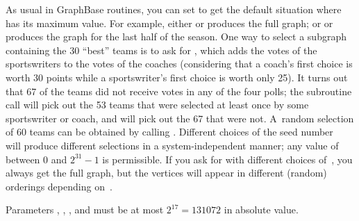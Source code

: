 As usual in GraphBase routines, you can set  to get the
default
situation where  has its maximum value. For example, either
 or  produces the
full graph;
 or 
or 
produces the graph for the last half
of the season. One way to select a subgraph containing the
30 ``best'' teams is to ask for , which adds
the votes of the sportswriters to the votes of the coaches
(considering that a coach's first choice is worth 30 points
while a sportswriter's first choice is worth only 25). It turns out
that 67 of the teams did not receive votes in any of the four polls;
the subroutine call  will pick out the 53 teams
that were selected at least once by some sportswriter or coach, and
will pick out the 67 that were not.
A~random selection of 60 teams can be obtained by calling
. Different
choices of the seed number~
will produce different selections in a system-independent manner;
any value of  between 0 and $2^{31}-1$ is permissible.
If you ask for  with different choices of~,
you always get the full graph, but the vertices will appear in different
(random) orderings depending on~.

Parameters , , ,
and  must be
at most $2^{17}=131072$ in absolute value.

